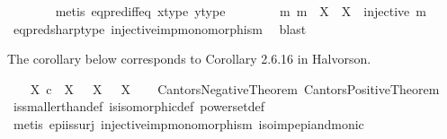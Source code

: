 \begin{isabellebody}
\ \ \ \ \ \ \isamarkupfalse%
\ {\isacharparenleft}{\kern0pt}metis\ eq{\isacharunderscore}{\kern0pt}pred{\isacharunderscore}{\kern0pt}iff{\isacharunderscore}{\kern0pt}eq\ x{\isacharunderscore}{\kern0pt}type\ y{\isacharunderscore}{\kern0pt}type{\isacharparenright}{\kern0pt}\isanewline
\ \ \isamarkupfalse%
\isanewline
\ \ \isamarkupfalse%
\ \isamarkupfalse%
\ {\isachardoublequoteopen}{\isasymexists}m{\isachardot}{\kern0pt}\ m\ {\isacharcolon}{\kern0pt}\ X\ {\isasymrightarrow}\ {\isasymOmega}\isactrlbsup X\isactrlesup \ {\isasymand}\ injective\ m{\isachardoublequoteclose}\isanewline
\ \ \ \ \isamarkupfalse%
\ eq{\isacharunderscore}{\kern0pt}pred{\isacharunderscore}{\kern0pt}sharp{\isacharunderscore}{\kern0pt}type\ injective{\isacharunderscore}{\kern0pt}imp{\isacharunderscore}{\kern0pt}monomorphism\ \isamarkupfalse%
\ blast\isanewline
{}\isamarkupfalse%
%
\endisatagproof
{\isafoldproof}%
%
\isadelimproof
%
\endisadelimproof
%
\begin{isamarkuptext}%
The corollary below corresponds to Corollary 2.6.16 in Halvorson.%
\end{isamarkuptext}\isamarkuptrue%
\isamarkupfalse%
\ \isanewline
\ \ {\isachardoublequoteopen}X\ {\isasymle}\isactrlsub c\ {\isasymP}\ X\ {\isasymand}\ {\isasymnot}\ {\isacharparenleft}{\kern0pt}X\ {\isasymcong}\ {\isasymP}\ X{\isacharparenright}{\kern0pt}{\isachardoublequoteclose}\isanewline
%
\isadelimproof
\ \ %
\endisadelimproof
%
\isatagproof
{}\isamarkupfalse%
\ Cantors{\isacharunderscore}{\kern0pt}Negative{\isacharunderscore}{\kern0pt}Theorem\ Cantors{\isacharunderscore}{\kern0pt}Positive{\isacharunderscore}{\kern0pt}Theorem\isanewline
\ \ \isamarkupfalse%
\ is{\isacharunderscore}{\kern0pt}smaller{\isacharunderscore}{\kern0pt}than{\isacharunderscore}{\kern0pt}def\ is{\isacharunderscore}{\kern0pt}isomorphic{\isacharunderscore}{\kern0pt}def\ powerset{\isacharunderscore}{\kern0pt}def\isanewline
\ \ \isamarkupfalse%
\ {\isacharparenleft}{\kern0pt}metis\ epi{\isacharunderscore}{\kern0pt}is{\isacharunderscore}{\kern0pt}surj\ injective{\isacharunderscore}{\kern0pt}imp{\isacharunderscore}{\kern0pt}monomorphism\ iso{\isacharunderscore}{\kern0pt}imp{\isacharunderscore}{\kern0pt}epi{\isacharunderscore}{\kern0pt}and{\isacharunderscore}{\kern0pt}monic{\isacharparenright}{\kern0pt}%
\endisatagproof
{\isafoldproof}%
%
\isadelimproof
\isanewline
%
\endisadelimproof
\isanewline
{}\isamarkupfalse%

\end{isabellebody}
